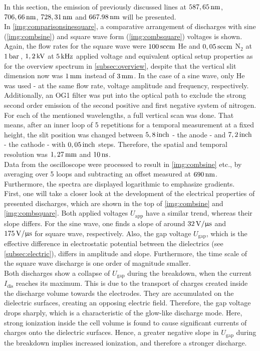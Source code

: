 \documentclass[a4paper,10pt,twoside]{article}
\newcommand{\ix}[1]{_\text{#1}}
\begin{document}
			In this section, the emission of previously discussed lines at $\unit[587,65]{nm}$, $\unit[706,66]{nm}$, $\unit[728,31]{nm}$ and $\unit[667.98]{nm}$ will be presented.\\
			In \autoref{img:comparisonsinesquare}, a comparative arrangement of discharges with sine (\autoref{img:combsine}) and square wave form (\autoref{img:combsquare}) voltages is shown. Again, the flow rates for the square wave were $\unit[100]{sccm}$ He and $\unit[0,05]{sccm}$ N$_2$ at $\unit[1]{bar}$\,, $\unit[1,2]{kV}$ at $\unit[5]{kHz}$ applied voltage and equivalent optical setup properties as for the overview spectrum in \autoref{subsec:overview}, despite that the vertical slit dimension now was $\unit[1]{mm}$ instead of $\unit[3]{mm}$. In the case of a sine wave, only He was used - at the same flow rate, voltage amplitude and frequency, respectively. Additionally, an OG1 filter was put into the optical path to exclude the strong second order emission of the second positive and first negative system of nitrogen.\\
			For each of the mentioned wavelengths, a full vertical scan was done. That means, after an inner loop of 5 repetitions for a temporal measurement at a fixed height, the slit position was changed between $\unit[5,8]{inch}$ - the anode - and $\unit[7,2]{inch}$ - the cathode - with $\unit[0,05]{inch}$ steps. Therefore, the spatial and temporal resolution was $\unit[1,27]{mm}$ and $\unit[10]{ns}$.\\
			Data from the oscilloscope were processed to result in \autoref{img:combsine} etc., by averaging over 5 loops and subtracting an offset measured at $\unit[690]{nm}$. Furthermore, the spectra are displayed logarithmic to emphasize gradients.\\
			First, one will take a closer look at the development of the electrical properties of presented discharges, which are shown in the top of \autoref{img:combsine} and \autoref{img:combsquare}. Both applied voltages $U\ix{app}$ have a similar trend, whereas their slope differs. For the sine wave, one finds a slope of around $\unit[32]{V/\upmu s}$ and $\unit[175]{V/\upmu s}$ for square wave, respectively. Also, the gap voltage $U\ix{gap}$, which is the effective difference in electrostatic potential between the dielectrics (see \autoref{subsec:electric}), differs in amplitude and slope. Furthermore, the time scale of the square wave discharge is one order of magnitude smaller.\\
			Both discharges show a collapse of $U\ix{gap}$ during the breakdown, when the current $I\ix{dis}$ reaches its maximum. This is due to the transport of charges created inside the discharge volume towards the electrodes. They are accumulated on the dielectric surfaces, creating an opposing electric field. Therefore, the gap voltage drops sharply, which is a characteristic of the glow-like discharge mode. Here, strong ionization inside the cell volume is found to cause significant currents of charges onto the dielectric surfaces. Hence, a greater negative slope in $U\ix{gap}$ during the breakdown implies increased ionization, and therefore a stronger discharge. \\
\end{document}
